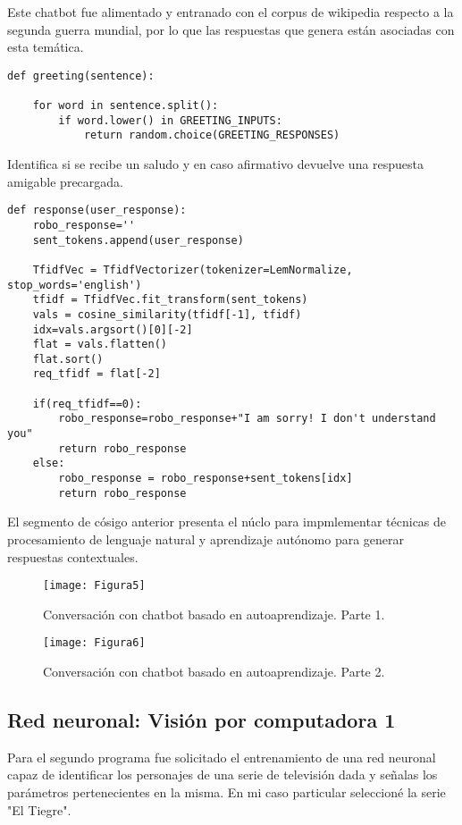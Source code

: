 \documentclass[a4paper,
               ]{jacow}
\begin{document}
Este chatbot fue alimentado y entranado con el corpus de wikipedia respecto a la segunda guerra mundial, por lo que las respuestas que genera están asociadas con esta temática.

\begin{lstlisting}
def greeting(sentence):

    for word in sentence.split():
        if word.lower() in GREETING_INPUTS:
            return random.choice(GREETING_RESPONSES)
\end{lstlisting}

Identifica si se recibe un saludo y en caso afirmativo devuelve una respuesta amigable precargada.

\begin{lstlisting}
def response(user_response):
    robo_response=''
    sent_tokens.append(user_response)

    TfidfVec = TfidfVectorizer(tokenizer=LemNormalize, stop_words='english')
    tfidf = TfidfVec.fit_transform(sent_tokens)
    vals = cosine_similarity(tfidf[-1], tfidf)
    idx=vals.argsort()[0][-2]
    flat = vals.flatten()
    flat.sort()
    req_tfidf = flat[-2]

    if(req_tfidf==0):
        robo_response=robo_response+"I am sorry! I don't understand you"
        return robo_response
    else:
        robo_response = robo_response+sent_tokens[idx]
        return robo_response
\end{lstlisting}
El segmento de cósigo anterior presenta el núclo para impmlementar técnicas de procesamiento de lenguaje natural y aprendizaje autónomo para generar respuestas contextuales.

\begin{figure}[!htb]
   \centering
   \captionsetup{justification=centering}
    \texttt{[image: Figura5]}
    \caption{Conversación con chatbot basado en autoaprendizaje. Parte 1.}
\end{figure}

\begin{figure}[!htb]
   \centering
   \captionsetup{justification=centering}
    \texttt{[image: Figura6]}
    \caption{Conversación con chatbot basado en autoaprendizaje. Parte 2.}
\end{figure}

\subsection{Red neuronal: Visión por computadora 1}
Para el segundo programa fue solicitado el entrenamiento de una red neuronal capaz de identificar los personajes de una serie de televisión dada y señalas los parámetros pertenecientes en la misma. En mi caso particular seleccioné la serie "El Tiegre".
\end{document}
